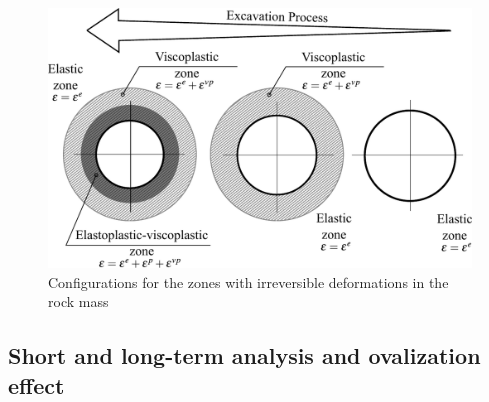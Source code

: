 \documentclass[a4paper,fleqn]{cas-sc}
\begin{document}
\begin{figure}[h!]
	\centering
	\includegraphics[scale=0.6]{zones.pdf}
	\caption{Configurations for the zones with irreversible deformations in the rock mass}
	\label{zones}
\end{figure}

\subsection{Short and long-term analysis and ovalization effect}\label{}
\end{document}
